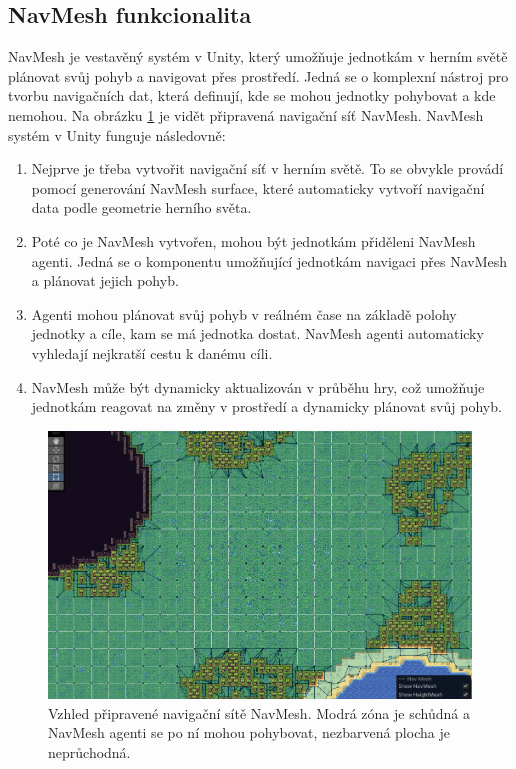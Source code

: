 \subsection{NavMesh funkcionalita}
\label{NavMesh}
NavMesh je vestavěný systém v Unity, který umožňuje jednotkám v herním světě plánovat svůj pohyb a navigovat přes prostředí. Jedná se o komplexní nástroj pro tvorbu navigačních dat, která definují, kde se mohou jednotky pohybovat a kde nemohou. Na obrázku \ref{fig:NavMesh} je vidět připravená navigační síť NavMesh. NavMesh systém v Unity funguje následovně:

\begin{enumerate}
	\item Nejprve je třeba vytvořit navigační síť v herním světě. To se obvykle provádí pomocí generování NavMesh surface, které automaticky vytvoří navigační data podle geometrie herního světa.
	\item Poté co je NavMesh vytvořen, mohou být jednotkám přiděleni NavMesh agenti. Jedná se o komponentu umožňující jednotkám navigaci přes NavMesh a plánovat jejich pohyb.
	\item Agenti mohou plánovat svůj pohyb v reálném čase na základě polohy jednotky a cíle, kam se má jednotka dostat. NavMesh agenti automaticky vyhledají nejkratší cestu k danému cíli.
	\item NavMesh může být dynamicky aktualizován v průběhu hry, což umožňuje jednotkám reagovat na změny v prostředí a dynamicky plánovat svůj pohyb.
\end{enumerate}

\begin{figure}[H]
	\centering
	\includegraphics[scale=0.6]{obrazky-figures/NavMeshBaked.png}
	\caption{Vzhled připravené navigační sítě NavMesh. Modrá zóna je schůdná a NavMesh agenti se po ní mohou pohybovat, nezbarvená plocha je neprůchodná.}
	\label{fig:NavMesh}
\end{figure}

